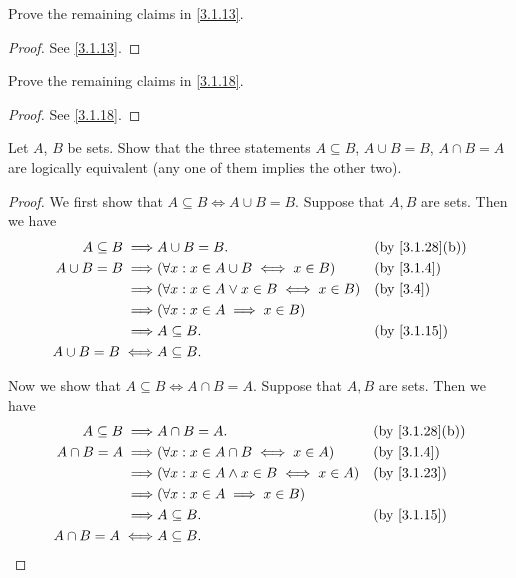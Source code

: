\begin{ex}\label{ex:3.1.3}
	Prove the remaining claims in \cref{3.1.13}.
\end{ex}

\begin{proof}
	See \cref{3.1.13}.
\end{proof}

\begin{ex}\label{ex:3.1.4}
	Prove the remaining claims in \cref{3.1.18}.
\end{ex}

\begin{proof}
	See \cref{3.1.18}.
\end{proof}

\begin{ex}\label{ex:3.1.5}
	Let \(A\), \(B\) be sets.
	Show that the three statements \(A \subseteq B\), \(A \cup B = B\), \(A \cap B = A\) are logically equivalent (any one of them implies the other two).
\end{ex}

\begin{proof}
	We first show that \(A \subseteq B \iff A \cup B = B\).
	Suppose that \(A, B\) are sets.
	Then we have
	\begin{align*}
		A \subseteq B \implies & A \cup B = B.                                   &  & \text{(by \cref{3.1.28}(b))} \\
		A \cup B = B \implies  & (\forall x : x \in A \cup B \iff x \in B)       &  & \by{3.1.4}                   \\
		\implies               & (\forall x : x \in A \lor x \in B \iff x \in B) &  & \by{3.4}                     \\
		\implies               & (\forall x : x \in A \implies x \in B)                                            \\
		\implies               & A \subseteq B.                                  &  & \by{3.1.15}                  \\
		A \cup B = B \iff      & A \subseteq B.
	\end{align*}

	Now we show that \(A \subseteq B \iff A \cap B = A\).
	Suppose that \(A, B\) are sets.
	Then we have
	\begin{align*}
		A \subseteq B \implies & A \cap B = A.                                    &  & \text{(by \cref{3.1.28}(b))} \\
		A \cap B = A \implies  & (\forall x : x \in A \cap B \iff x \in A)        &  & \by{3.1.4}                   \\
		\implies               & (\forall x : x \in A \land x \in B \iff x \in A) &  & \by{3.1.23}                  \\
		\implies               & (\forall x : x \in A \implies x \in B)                                             \\
		\implies               & A \subseteq B.                                   &  & \by{3.1.15}                  \\
		A \cap B = A \iff      & A \subseteq B.
	\end{align*}
\end{proof}

